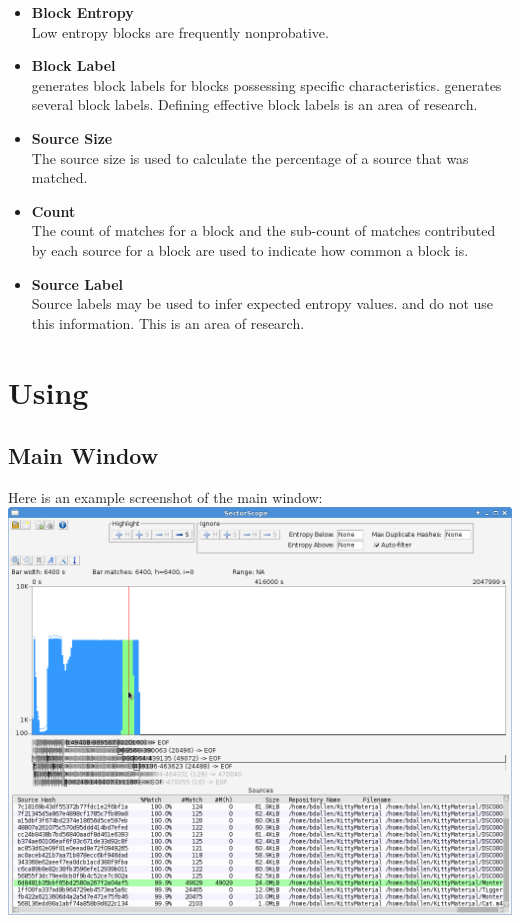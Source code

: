\documentclass[11pt,fleqn]{article} %
\begin{document}
\begin{itemize}
\item \textbf{Block Entropy}\\
Low entropy blocks are frequently nonprobative.
\item \textbf{Block Label}\\
\hdb generates block labels for blocks possessing specific characteristics. \hdb generates several block labels. Defining effective block labels is an area of research.
\item \textbf{Source Size}\\
The source size is used to calculate the percentage of a source that was matched.
\item \textbf{Count}\\
The count of matches for a block and the sub-count of matches contributed by each source for a block are used to indicate how common a block is.
\item \textbf{Source Label}\\
Source labels may be used to infer expected entropy values. \hdb and \sscope do not use this information. This is an area of research.
\end{itemize}

\section{Using \sscope}
\subsection{Main Window}
Here is an example screenshot of the \sscope main window:\\
\includegraphics[scale=.4]{screenshots/main_window}\\
\end{document}
